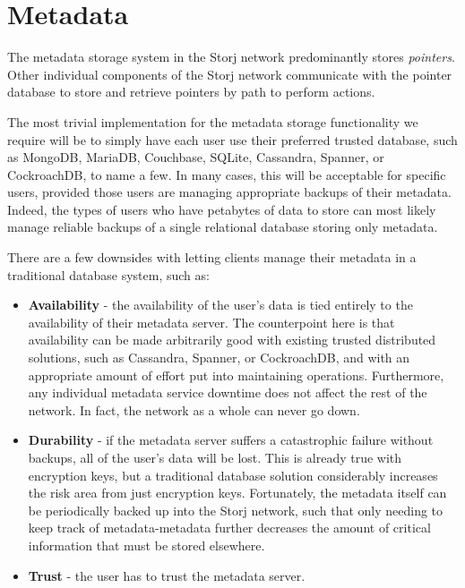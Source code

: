 \documentclass[8pt,fleqn,openany]{book}
\begin{document}
\section{Metadata}\label{sec:concrete-metadata}

The metadata storage system in the Storj network predominantly stores
{\em pointers}. Other individual components of the Storj network communicate with
the pointer database to store and retrieve pointers by path to perform actions.

The most trivial implementation for the metadata storage functionality we
require will be to simply have each user use their preferred trusted database,
such as MongoDB, MariaDB, Couchbase, SQLite, Cassandra\cite{cassandra},
Spanner\cite{spanner}, or CockroachDB, to name a few. In many cases, this will
be acceptable for specific users, provided those users are managing appropriate
backups of their metadata. Indeed, the types of users who have petabytes of data
to store can most likely manage reliable backups of a single relational database
storing only metadata.

There are a few downsides with letting clients manage their metadata in a
traditional database system, such as:
\begin{itemize}
\item {\bf Availability} - the availability of the user's data
is tied entirely to the availability of their metadata server. The counterpoint
here is that availability can be made arbitrarily good with existing trusted
distributed solutions, such as Cassandra, Spanner, or CockroachDB, and with an
appropriate amount of effort put into maintaining operations. Furthermore, any
individual metadata service downtime does not affect the rest of the network. In
fact, the network as a whole can never go down.
\item {\bf Durability} -
if the metadata server suffers a catastrophic failure without backups, all of
the user's data will be lost. This is already true with encryption keys,
but a traditional database solution considerably increases the risk area from just
encryption keys. Fortunately, the metadata itself can be periodically backed
up into the Storj network,
such that only needing to keep track of metadata-metadata
further decreases the amount of critical information that must be stored
elsewhere.
\item {\bf Trust} - the user has to trust the metadata server.
\end{itemize}
\end{document}
